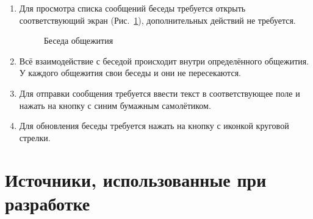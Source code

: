 \documentclass{../includes/TechDoc}
\begin{document}
    \begin{enumerate}
        \item Для просмотра списка сообщений беседы требуется открыть соответствующий экран (Рис.~\ref{fig:chat}), дополнительных действий не требуется.
        \begin{figure}[ht]
            \centering
            \caption{Беседа общежития}
            \label{fig:chat}
        \end{figure}

        \item Всё взаимодействие с беседой происходит внутри определённого общежития. У каждого общежития свои беседы и они не пересекаются.
        \item Для отправки сообщения требуется ввести текст в соответствующее поле и нажать на кнопку с синим бумажным самолётиком.
        \item Для обновления беседы требуется нажать на кнопку с иконкой круговой стрелки.
    \end{enumerate}


    \section{Источники, использованные при разработке}
\end{document}
